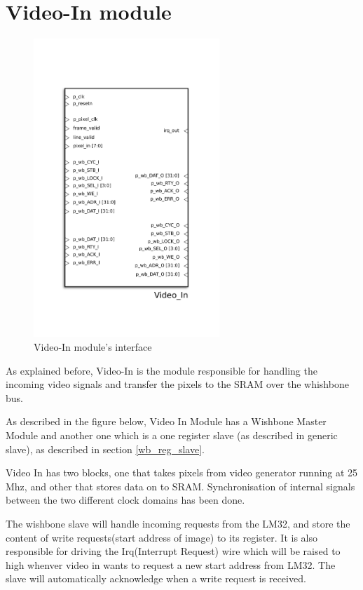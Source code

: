 
\section{Video-In module}
\begin{figure}[H]
\center
\includegraphics[width=7cm]{figs/Video_in.pdf}
\caption{Video-In module's interface}
\label{VideoIn_interface}
\end{figure}

As explained before, Video-In is the module responsible for handling the incoming video signals and transfer the pixels to the SRAM over the whishbone bus.

As described in the figure below, Video In Module has a Wishbone Master Module and another one which is a one register slave (as described in generic slave), as described in section \ref{wb_reg_slave}.

Video In has two blocks, one that takes pixels from video generator running at 25 Mhz, and other that stores data on to SRAM. Synchronisation of internal signals between the two different clock domains has been done.

The wishbone slave will handle incoming requests from the LM32, and store the content of write requests(start address of image) to its register. It is also responsible for driving the Irq(Interrupt Request) wire which will be raised to high whenver video in wants to request a new start address from LM32. The slave will automatically acknowledge when a write request is received.

